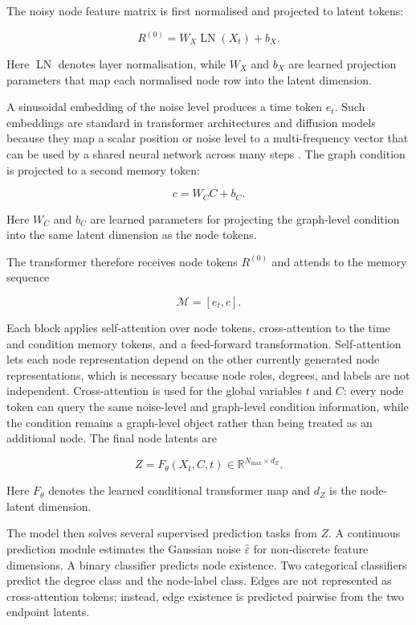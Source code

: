 The noisy node feature matrix is first normalised and projected to
latent tokens:

\[
    R^{(0)} = W_X \operatorname{LN}(X_t) + b_X.
\]

Here \(\operatorname{LN}\) denotes layer normalisation, while \(W_X\) and
\(b_X\) are learned projection parameters that map each normalised node row
into the latent dimension.

A sinusoidal embedding of the noise level produces a time token \(e_t\). Such
embeddings are standard in transformer architectures and diffusion models
because they map a scalar position or noise level to a multi-frequency vector
that can be used by a shared neural network across many steps
\citep{vaswani2017attention,ho2020ddpm}. The graph condition is projected to a
second memory token:

\[
    c = W_C C + b_C.
\]

Here \(W_C\) and \(b_C\) are learned parameters for projecting the graph-level
condition into the same latent dimension as the node tokens.

The transformer therefore receives node tokens \(R^{(0)}\) and attends to the
memory sequence

\[
    \mathcal{M} = [e_t, c].
\]

Each block applies self-attention over node tokens, cross-attention to the time
and condition memory tokens, and a feed-forward transformation. Self-attention
lets each node representation depend on the other currently generated node
representations, which is necessary because node roles, degrees, and labels are
not independent. Cross-attention is used for the global variables \(t\) and
\(C\): every node token can query the same noise-level and graph-level
condition information, while the condition remains a graph-level object rather
than being treated as an additional node. The final node latents are

\[
    Z = F_\theta(X_t, C, t) \in
    \mathbb{R}^{N_{\max} \times d_Z}.
\]

Here \(F_\theta\) denotes the learned conditional transformer map and \(d_Z\)
is the node-latent dimension.

The model then solves several supervised prediction tasks from \(Z\). A
continuous prediction module estimates the Gaussian noise
\(\hat{\varepsilon}\) for non-discrete feature dimensions. A binary classifier
predicts node existence. Two categorical classifiers predict the degree class
and the node-label class. Edges are not represented as cross-attention tokens;
instead, edge existence is predicted pairwise from the two endpoint latents.

